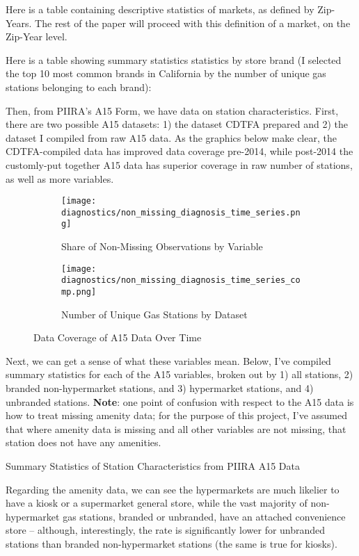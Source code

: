 \documentclass{article}
\begin{document}
Here is a table containing descriptive statistics of markets, as defined by Zip-Years. The rest of the paper will proceed with this definition of a market, on the Zip-Year level.


Here is a table showing summary statistics statistics by store brand (I selected the top 10 most common brands in California by the number of unique gas stations belonging to each brand):


Then, from PIIRA's A15 Form, we have data on station characteristics. First, there are two possible A15 datasets: 1) the dataset CDTFA prepared and 2) the dataset I compiled from raw A15 data. As the graphics below make clear, the CDTFA-compiled data has improved data coverage pre-2014, while post-2014 the customly-put together A15 data has superior coverage in raw number of stations, as well as more variables.
\begin{figure}[H]
\centering
	\begin{subfigure}[t]{0.4\textwidth}
		\texttt{[image: diagnostics/non\_missing\_diagnosis\_time\_series.png]}
		\caption{Share of Non-Missing Observations by Variable}
	\end{subfigure}
	\begin{subfigure}[t]{0.4\textwidth}
		\texttt{[image: diagnostics/non\_missing\_diagnosis\_time\_series\_comp.png]}
		\caption{Number of Unique Gas Stations by Dataset}
	\end{subfigure}
\caption{Data Coverage of A15 Data Over Time}
\end{figure}

Next, we can get a sense of what these variables mean. Below, I've compiled summary statistics for each of the A15 variables, broken out by 1) all stations, 2) branded non-hypermarket stations, and 3) hypermarket stations, and 4) unbranded stations.
\textbf{Note}: one point of confusion with respect to the A15 data is how to treat missing amenity data; for the purpose of this project, I've assumed that where amenity data is missing and all other variables are not missing, that station does not have any amenities.

\begin{table}[H]
\centering
\caption{Summary Statistics of Station Characteristics from PIIRA A15 Data}
 	
\end{table}

Regarding the amenity data, we can see the hypermarkets are much likelier to have a kiosk or a supermarket general store, while the vast majority of non-hypermarket gas stations, branded or unbranded, have an attached convenience store -- although, interestingly, the rate is significantly lower for unbranded stations than branded non-hypermarket stations (the same is true for kiosks). 
\end{document}
